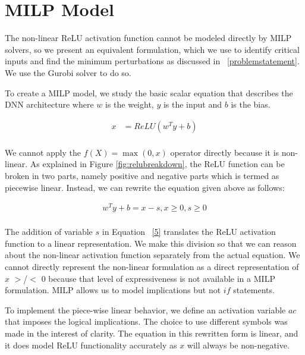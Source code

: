\section{MILP Model}
The non-linear ReLU activation function cannot be modeled directly by MILP solvers, so we present an equivalent formulation, which we use to identify critical inputs and find the minimum perturbations as discussed in ~\ref{problemstatement}. 
We use the Gurobi solver to do so. 

 To create a \ac{MILP} model, we study the basic scalar equation that describes the \ac{DNN} architecture where $w$ is the weight, $y$ is the input and $b$ is the bias. 

\begin{equation}
\label{4}
\begin{aligned}
x &= ReLU(w^Ty + b) \\
\end{aligned}
\end{equation}
 

We cannot apply the $f(X) = \max(0, x)$ operator directly because it is non-linear. 
As explained in Figure \ref{fig:relubreakdown}, the ReLU function can be broken in two parts, namely positive and negative parts which is termed as piecewise linear. 
Instead, we can rewrite the equation given above as follows:

\begin{equation}
\label{5}
\begin{aligned}
w^Ty + b = x - s, x \geq 0, s \geq 0 \\
\end{aligned}
\end{equation}

The addition of variable $s$ in Equation ~\ref{5} translates the ReLU activation function to a linear representation.
We make this division so that we can reason about the non-linear activation function separately from the actual equation. 
We cannot directly represent the non-linear formulation as a direct representation of $x$ $>$/$<$ $0$ because that level of expressiveness is not available in a \ac{MILP}  formulation. 
\ac{MILP} allows us to model implications but not $if$ statements.



 To implement the piece-wise linear behavior, we define an activation variable $ac$ that imposes the logical implications. 
The choice to use different symbols was made in the interest of clarity. 
The equation in this rewritten form is linear, and it does model ReLU functionality  accurately as $x$ will always be non-negative. 

